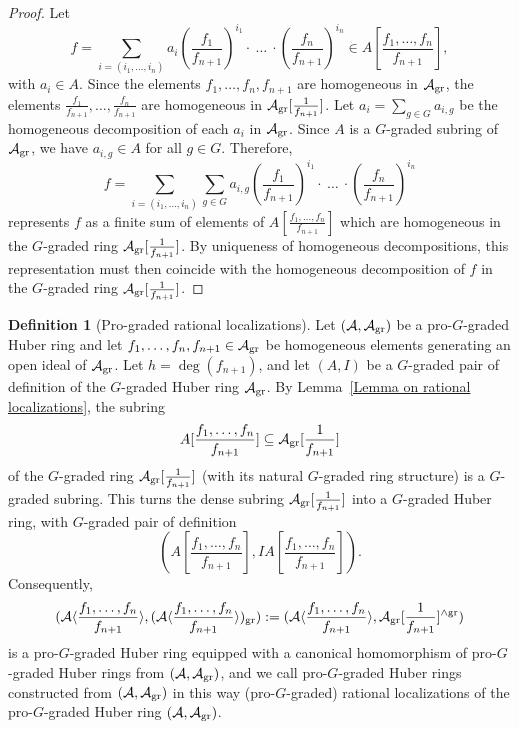 \documentclass[12pt,twoside,a4paper]{article}
\theoremstyle{definition}
\newtheorem{mydef}[thm]{Definition}
\theoremstyle{remark}
\newcommand\gr{{\rm gr}}
\begin{document}
\begin{proof}Let \begin{equation*}f=\sum_{i=(i_{1},\dots, i_{n})}a_{i}(\frac{f_{1}}{f_{n+1}})^{i_{1}}\cdot~\dots~\cdot (\frac{f_{n}}{f_{n+1}})^{i_{n}}\in A[\frac{f_1,\dots, f_{n}}{f_{n+1}}],\end{equation*}with $a_{i}\in A$. Since the elements $f_1,\dots, f_{n}, f_{n+1}$ are homogeneous in $\mathcal{A}_{\gr}$, the elements $\frac{f_{1}}{f_{n+1}},\dots, \frac{f_{n}}{f_{n+1}}$ are homogeneous in $\mathcal{A}_{\gr}[\frac{1}{f_{n+1}}]$. Let $a_{i}=\sum_{g\in G}a_{i, g}$ be the homogeneous decomposition of each $a_{i}$ in $\mathcal{A}_{\gr}$. Since $A$ is a $G$-graded subring of $\mathcal{A}_{\gr}$, we have $a_{i, g}\in A$ for all $g\in G$. Therefore, \begin{equation*}f=\sum_{i=(i_1,\dots, i_{n})}\sum_{g\in G}a_{i, g}(\frac{f_{1}}{f_{n+1}})^{i_{1}}\cdot~\dots~\cdot (\frac{f_{n}}{f_{n+1}})^{i_{n}}\end{equation*}represents $f$ as a finite sum of elements of $A[\frac{f_1,\dots, f_n}{f_{n+1}}]$ which are homogeneous in the $G$-graded ring $\mathcal{A}_{\gr}[\frac{1}{f_{n+1}}]$. By uniqueness of homogeneous decompositions, this representation must then coincide with the homogeneous decomposition of $f$ in the $G$-graded ring $\mathcal{A}_{\gr}[\frac{1}{f_{n+1}}]$.\end{proof}
\begin{mydef}[Pro-graded rational localizations]\label{Pro-graded rational localizations}Let $(\mathcal{A}, \mathcal{A}_{\gr})$ be a pro-$G$-graded Huber ring and let $f_{1},\dots, f_{n}, f_{n+1}\in \mathcal{A}_{\gr}$ be homogeneous elements generating an open ideal of $\mathcal{A}_{\gr}$. Let $h=\deg(f_{n+1})$, and let $(A, I)$ be a $G$-graded pair of definition of the $G$-graded Huber ring $\mathcal{A}_{\gr}$. By Lemma~\ref{Lemma on rational localizations}, the subring \begin{equation*}A[\frac{f_{1},\dots, f_{n}}{f_{n+1}}]\subseteq \mathcal{A}_{\gr}[\frac{1}{f_{n+1}}]\end{equation*}of the $G$-graded ring $\mathcal{A}_{\gr}[\frac{1}{f_{n+1}}]$ (with its natural $G$-graded ring structure) is a $G$-graded subring. This turns the dense subring $\mathcal{A}_{\gr}[\frac{1}{f_{n+1}}]$ into a $G$-graded Huber ring, with $G$-graded pair of definition \begin{equation*}(A[\frac{f_1,\dots, f_n}{f_{n+1}}], IA[\frac{f_1,\dots, f_n}{f_{n+1}}]).\end{equation*}Consequently,\begin{equation*}(\mathcal{A}\langle \frac{f_1,\dots, f_n}{f_{n+1}}\rangle, (\mathcal{A}\langle \frac{f_1,\dots, f_n}{f_{n+1}}\rangle)_{\gr}):=(\mathcal{A}\langle \frac{f_1,\dots, f_n}{f_{n+1}}\rangle, \mathcal{A}_{\gr}[\frac{1}{f_{n+1}}]^{\wedge\gr})\end{equation*}is a pro-$G$-graded Huber ring equipped with a canonical homomorphism of pro-$G$-graded Huber rings from $(\mathcal{A}, \mathcal{A}_{\gr})$, and we call pro-$G$-graded Huber rings constructed from $(\mathcal{A}, \mathcal{A}_{\gr})$ in this way (pro-$G$-graded) rational localizations of the pro-$G$-graded Huber ring $(\mathcal{A}, \mathcal{A}_{\gr})$. \end{mydef}
\end{document}
